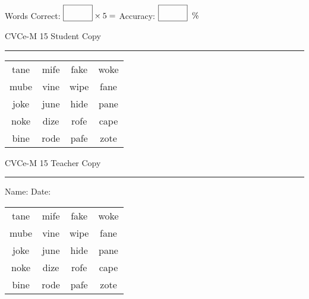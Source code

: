 \documentclass{memoir}
\begin{document}
\small

Words Correct: $\fbox{\phantom{\huge 100}} \times 5 = $ Accuracy: $\fbox{\phantom{\huge 100}}\;\; \%$ 

\vfill

\newpage


\footnotesize \noindent
CVCe-M 15 \hfill Student Copy
\smallskip
\hrule

\Large

\setlength{\tabcolsep}{14pt}
\def\arraystretch{2}

{\selectfont


\begin{vplace}[0.5]
\begin{center}
\begin{tabular}{cccc}
tane & mife & fake & woke \\
mube & vine & wipe & fane \\
joke & june & hide & pane \\
noke & dize & rofe & cape \\
bine & rode & pafe & zote \\
\end{tabular}
\end{center}
\end{vplace}

}

\newpage

\footnotesize \noindent
CVCe-M 15 \hfill Teacher Copy
\smallskip
\hrule

\small

\vfill

\noindent
Name: \underline{\hspace{1.75in}} \hfill Date: \underline{\hspace{1in}}

\Large

{\selectfont


\begin{vplace}[0.5]
\begin{center}
\begin{tabular}{cccc}
tane & mife & fake & woke \\
mube & vine & wipe & fane \\
joke & june & hide & pane \\
noke & dize & rofe & cape \\
bine & rode & pafe & zote \\
\end{tabular}
\end{center}
\end{vplace}



}
\end{document}
